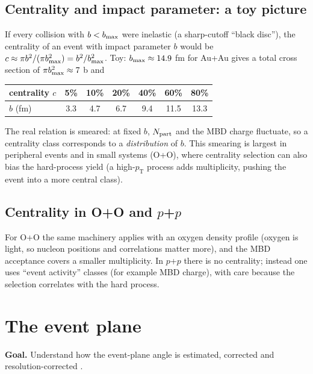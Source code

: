 \documentclass[11pt,letterpaper]{article}
\newcommand{\goal}[1]{\noindent\textbf{Goal.} #1\par}
\newcommand{\pT}{p_{\mathrm{T}}}
\begin{document}
\subsection{Centrality and impact parameter: a toy picture}
If every collision with $b<b_{\rm max}$ were inelastic (a sharp-cutoff ``black disc''), the centrality of an event with impact
parameter $b$ would be $c\approx\pi b^2/(\pi b_{\rm max}^2)=b^2/b_{\rm max}^2$. Toy: $b_{\rm max}\approx14.9$ fm for Au+Au gives a
total cross section of $\pi b_{\rm max}^2\approx7$ b and
\begin{center}\small
\begin{tabular}{@{}lcccccc@{}}\toprule
centrality $c$ & 5\% & 10\% & 20\% & 40\% & 60\% & 80\%\\\midrule
$b$ (fm) & 3.3 & 4.7 & 6.7 & 9.4 & 11.5 & 13.3\\\bottomrule
\end{tabular}\end{center}
The real relation is smeared: at fixed $b$, $N_{\rm part}$ and the MBD charge fluctuate, so a centrality class corresponds to a
\emph{distribution} of $b$. This smearing is largest in peripheral events and in small systems (O+O), where centrality selection
can also bias the hard-process yield (a high-$\pT$ process adds multiplicity, pushing the event into a more central class).

\subsection{Centrality in O+O and $p$+$p$}
For O+O the same machinery applies with an oxygen density profile (oxygen is light, so nucleon positions and correlations
matter more), and the MBD acceptance covers a smaller multiplicity. In $p$+$p$ there is no centrality; instead one uses
``event activity'' classes (for example MBD charge), with care because the selection correlates with the hard process.

\section{The event plane}\label{sec:ep}
\goal{Understand how the event-plane angle is estimated, corrected and resolution-corrected \cite{pv}.}
\end{document}
